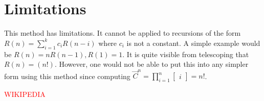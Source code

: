 \documentclass{article}
\begin{document}
\section{Limitations}
This method has limitations. It cannot be applied to recursions of the form
$R(n)=\sum_{i=1}^{k}c_{i}R(n-i)$ where $c_{i}$ is not a constant. A
simple example would be $R(n)=nR(n-1), R(1)=1$. It is quite visible from
telescoping that $R(n)=(n!)$. However, one would not be able to put this into
any simpler form using this method since computing
$\vec{C}^n=\prod_{i=1}^{n}\begin{bmatrix}i\end{bmatrix}=n! $.

\begin{thebibliography}{9}

\textcolor{red}{WIKIPEDIA}

\end{thebibliography} %
\end{document}
